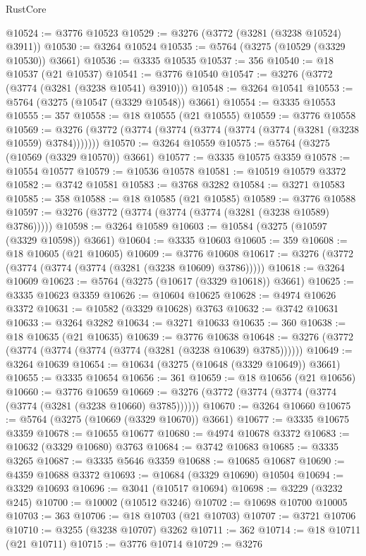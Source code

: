\begin{lexlean}{RustCore}
\begin{coremodule}
@10524 := @3776 @10523
@10529 := @3276 (@3772 (@3281 (@3238 @10524) @3911))
@10530 := @3264 @10524
@10535 := @5764 (@3275 (@10529 (@3329 @10530)) @3661)
@10536 := @3335 @10535
@10537 := 356
@10540 := @18 @10537 (@21 @10537)
@10541 := @3776 @10540
@10547 := @3276 (@3772 (@3774 (@3281 (@3238 @10541) @3910)))
@10548 := @3264 @10541
@10553 := @5764 (@3275 (@10547 (@3329 @10548)) @3661)
@10554 := @3335 @10553
@10555 := 357
@10558 := @18 @10555 (@21 @10555)
@10559 := @3776 @10558
@10569 := @3276 (@3772 (@3774 (@3774 (@3774 (@3774 (@3774 (@3281 (@3238 @10559) @3784)))))))
@10570 := @3264 @10559
@10575 := @5764 (@3275 (@10569 (@3329 @10570)) @3661)
@10577 := @3335 @10575 @3359
@10578 := @10554 @10577
@10579 := @10536 @10578
@10581 := @10519 @10579 @3372
@10582 := @3742 @10581
@10583 := @3768 @3282
@10584 := @3271 @10583
@10585 := 358
@10588 := @18 @10585 (@21 @10585)
@10589 := @3776 @10588
@10597 := @3276 (@3772 (@3774 (@3774 (@3774 (@3281 (@3238 @10589) @3786)))))
@10598 := @3264 @10589
@10603 := @10584 (@3275 (@10597 (@3329 @10598)) @3661)
@10604 := @3335 @10603
@10605 := 359
@10608 := @18 @10605 (@21 @10605)
@10609 := @3776 @10608
@10617 := @3276 (@3772 (@3774 (@3774 (@3774 (@3281 (@3238 @10609) @3786)))))
@10618 := @3264 @10609
@10623 := @5764 (@3275 (@10617 (@3329 @10618)) @3661)
@10625 := @3335 @10623 @3359
@10626 := @10604 @10625
@10628 := @4974 @10626 @3372
@10631 := @10582 (@3329 @10628) @3763
@10632 := @3742 @10631
@10633 := @3264 @3282
@10634 := @3271 @10633
@10635 := 360
@10638 := @18 @10635 (@21 @10635)
@10639 := @3776 @10638
@10648 := @3276 (@3772 (@3774 (@3774 (@3774 (@3774 (@3281 (@3238 @10639) @3785))))))
@10649 := @3264 @10639
@10654 := @10634 (@3275 (@10648 (@3329 @10649)) @3661)
@10655 := @3335 @10654
@10656 := 361
@10659 := @18 @10656 (@21 @10656)
@10660 := @3776 @10659
@10669 := @3276 (@3772 (@3774 (@3774 (@3774 (@3774 (@3281 (@3238 @10660) @3785))))))
@10670 := @3264 @10660
@10675 := @5764 (@3275 (@10669 (@3329 @10670)) @3661)
@10677 := @3335 @10675 @3359
@10678 := @10655 @10677
@10680 := @4974 @10678 @3372
@10683 := @10632 (@3329 @10680) @3763
@10684 := @3742 @10683
@10685 := @3335 @3265
@10687 := @3335 @5646 @3359
@10688 := @10685 @10687
@10690 := @4359 @10688 @3372
@10693 := @10684 (@3329 @10690) @10504
@10694 := @3329 @10693
@10696 := @3041 (@10517 @10694)
@10698 := @3229 (@3232 @245)
@10700 := @10002 (@10512 @3246)
@10702 := @10698 @10700 @10005
@10703 := 363
@10706 := @18 @10703 (@21 @10703)
@10707 := @3721 @10706
@10710 := @3255 (@3238 @10707) @3262
@10711 := 362
@10714 := @18 @10711 (@21 @10711)
@10715 := @3776 @10714
@10729 := @3276

\end{coremodule}
\end{lexlean}
